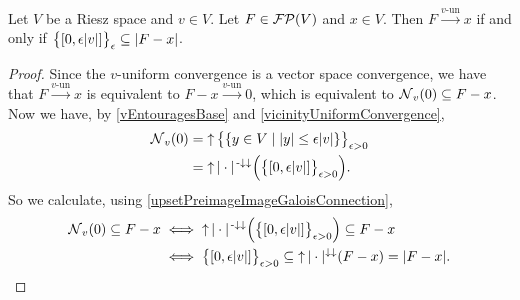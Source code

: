 \begin{lemma}
Let $V$ be a Riesz space and $v\in V$. Let $F\in \operatorname{\mathcal{FP}}(V)$ and $x\in V$. Then $F\overset{\text{$v$-un}}{\longrightarrow} x$ \textup{if and only if} $\big\{\interval{0,\epsilon|v|}\big\}_{\epsilon} \subseteq |F - x|$.
\end{lemma}
\begin{proof}
Since the $v$-uniform convergence is a vector space convergence, we have that $F\overset{\text{$v$-un}}{\longrightarrow} x$ is equivalent to $F-x\overset{\text{$v$-un}}{\longrightarrow} 0$, which is equivalent to $\operatorname{\mathcal{N}}_v(0) \subseteq F-x$. Now we have, by \ref{vEntouragesBase} and \ref{vicinityUniformConvergence},
\begin{align*}
\neighbourhoods_v(0) &= \upset\big\{ \setbuilder{y\in V}{|y| \leq \epsilon |v|} \big\}_{\epsilon > 0} \\
&= \upset|\cdot|^{\preimf\imf}\Big(\big\{ \interval{0, \epsilon |v|} \big\}_{\epsilon > 0}\Big).
\end{align*}
So we calculate, using \ref{upsetPreimageImageGaloisConnection},
\begin{align*}
\neighbourhoods_v(0) \subseteq F-x &\iff \upset|\cdot|^{\preimf\imf}\Big(\big\{ \interval{0, \epsilon |v|} \big\}_{\epsilon > 0}\Big) \subseteq F-x \\
&\iff \big\{ \interval{0, \epsilon |v|} \big\}_{\epsilon > 0} \subseteq \upset |\cdot|^{\imf\imf}(F-x) = |F-x|.
\end{align*}
\end{proof}

